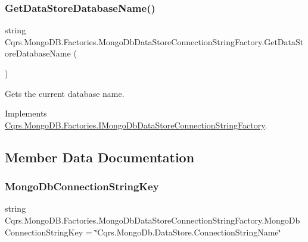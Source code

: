 \subsubsection{\texorpdfstring{Get\+Data\+Store\+Database\+Name()}{GetDataStoreDatabaseName()}}
{\footnotesize\ttfamily string Cqrs.\+Mongo\+D\+B.\+Factories.\+Mongo\+Db\+Data\+Store\+Connection\+String\+Factory.\+Get\+Data\+Store\+Database\+Name (\begin{DoxyParamCaption}{ }\end{DoxyParamCaption})}



Gets the current database name. 



Implements \hyperlink{interfaceCqrs_1_1MongoDB_1_1Factories_1_1IMongoDbDataStoreConnectionStringFactory_aca9921fae4214a9eb22a221825c57363_aca9921fae4214a9eb22a221825c57363}{Cqrs.\+Mongo\+D\+B.\+Factories.\+I\+Mongo\+Db\+Data\+Store\+Connection\+String\+Factory}.



\subsection{Member Data Documentation}
\mbox{\label{classCqrs_1_1MongoDB_1_1Factories_1_1MongoDbDataStoreConnectionStringFactory_af6b4a1e2a8dfaa3989ec3c6d0f0803e1_af6b4a1e2a8dfaa3989ec3c6d0f0803e1}} 
\subsubsection{\texorpdfstring{Mongo\+Db\+Connection\+String\+Key}{MongoDbConnectionStringKey}}
{\footnotesize\ttfamily string Cqrs.\+Mongo\+D\+B.\+Factories.\+Mongo\+Db\+Data\+Store\+Connection\+String\+Factory.\+Mongo\+Db\+Connection\+String\+Key = \char`\"{}Cqrs.\+Mongo\+Db.\+Data\+Store.\+Connection\+String\+Name\char`\"{}\hspace{0.3cm}{\ttfamily [static]}}

